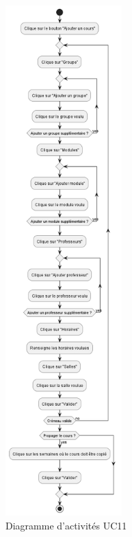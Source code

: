\documentclass[a4paper,12pt]{article}
\begin{document}
\begin{figure}[h]
    \centering
    \includegraphics[width=0.4\textwidth]{Diag_activites_UC11.png}
    \caption{Diagramme d'activités UC11}
    \label{fig:act_011}
\end{figure}
\end{document}
